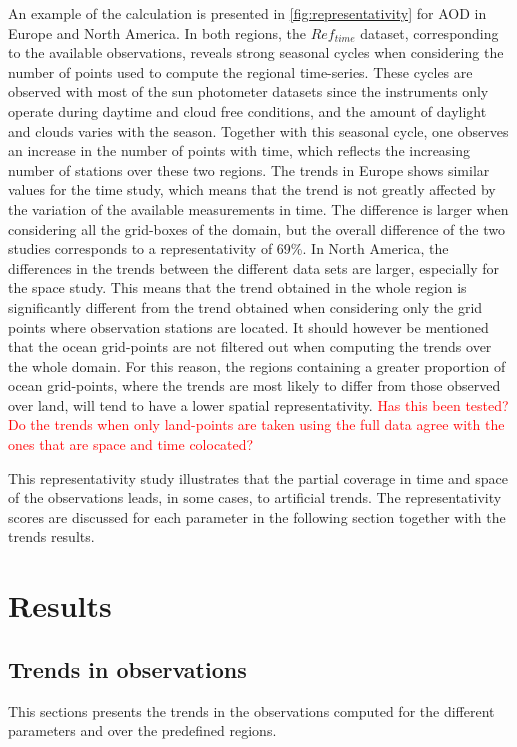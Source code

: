 \documentclass[journal abbreviation, manuscript]{copernicus}
\begin{document}
An example of the calculation is presented in \ref{fig:representativity} for AOD in Europe and North America. In both regions, the $Ref_{time}$ dataset, corresponding to the available observations, reveals strong seasonal cycles when considering the number of points used to compute the regional time-series. These cycles are observed with most of the sun photometer datasets since the instruments only operate during daytime and cloud free conditions, and the amount of daylight and clouds varies with the season. Together with this seasonal cycle, one observes an increase in the number of points with time, which reflects the increasing number of stations over these two regions. The trends in Europe shows similar values for the time study, which means that the trend is not greatly affected by the variation of the available measurements in time. The difference is larger when considering all the grid-boxes of the domain, but the overall difference of the two studies corresponds to a representativity of 69\%. In North America, the differences in the trends between the different data sets are larger, especially for the space study. This means that the trend obtained in the whole region is significantly different from the trend obtained when considering only the grid points where observation stations are located. It should however be mentioned that the ocean grid-points are not filtered out when computing the trends over the whole domain. For this reason, the regions containing a greater proportion of ocean grid-points, where the trends are most likely to differ from those observed over land, will tend to have a lower spatial representativity. \textcolor{red}{Has this been tested? Do the trends when only land-points are taken using the full data agree with the ones that are space and time colocated?} 

This representativity study illustrates that the partial coverage in time and space of the observations leads, in some cases, to artificial trends. The representativity scores are discussed for each parameter in the following section together with the trends results.

\section{Results}

\subsection{Trends in observations}
This sections presents the trends in the observations computed for the different parameters and over the predefined regions.
\end{document}
